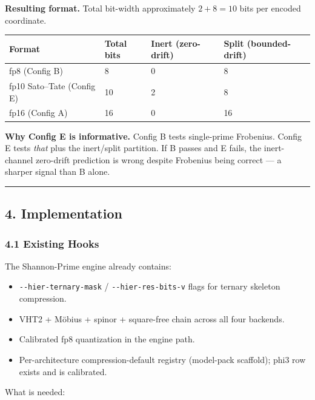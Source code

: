 \documentclass[
  11pt,
]{article}
\providecommand{\tightlist}{%
  \setlength{\itemsep}{0pt}\setlength{\parskip}{0pt}}
\begin{document}
\textbf{Resulting format.} Total bit-width approximately \(2 + 8 = 10\)
bits per encoded coordinate.

\begin{longtable}[]{@{}llll@{}}
\toprule
Format & Total bits & Inert (zero-drift) & Split
(bounded-drift)\tabularnewline
\midrule
\endhead
fp8 (Config B) & 8 & 0 & 8\tabularnewline
fp10 Sato--Tate (Config E) & 10 & 2 & 8\tabularnewline
fp16 (Config A) & 16 & 0 & 16\tabularnewline
\bottomrule
\end{longtable}

\textbf{Why Config E is informative.} Config B tests single-prime
Frobenius. Config E tests \emph{that} plus the inert/split partition. If
B passes and E fails, the inert-channel zero-drift prediction is wrong
despite Frobenius being correct --- a sharper signal than B alone.

\begin{center}\rule{0.5\linewidth}{0.5pt}\end{center}

\hypertarget{implementation}{%
\subsection{4. Implementation}\label{implementation}}

\hypertarget{existing-hooks}{%
\subsubsection{4.1 Existing Hooks}\label{existing-hooks}}

The Shannon-Prime engine already contains:

\begin{itemize}
\tightlist
\item
  \texttt{-\/-hier-ternary-mask} / \texttt{-\/-hier-res-bits-v} flags
  for ternary skeleton compression.
\item
  VHT2 + Möbius + spinor + square-free chain across all four backends.
\item
  Calibrated fp8 quantization in the engine path.
\item
  Per-architecture compression-default registry (model-pack scaffold);
  phi3 row exists and is calibrated.
\end{itemize}

What is needed:
\end{document}
